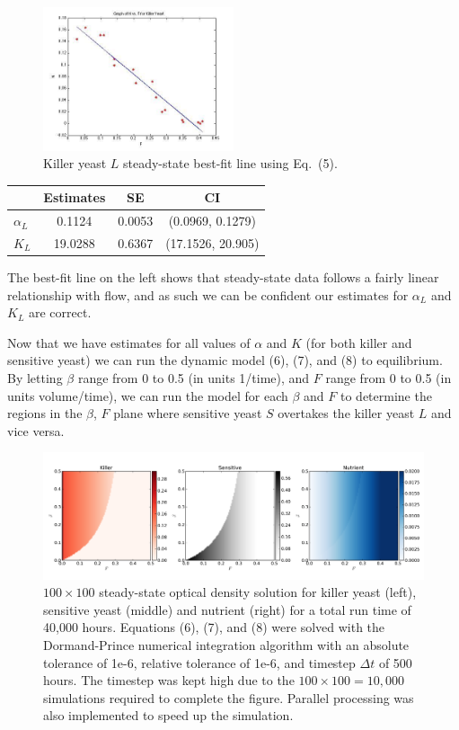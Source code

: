 \begin{multicols}{2}
\begin{figure}[H]
  \centering
    \includegraphics[width=0.5\textwidth]{images/killerFit.jpg}
  \caption{\footnotesize Killer yeast $L$ steady-state best-fit line using Eq.\ (5).}
\end{figure}
\begin{center}
\begin{tabular}{l | c c c}
  & Estimates & SE & CI \\ 
  \hline
  $\alpha_L$ & 0.1124  & 0.0053 & (0.0969,  0.1279) \\
  $K_L$      & 19.0288 & 0.6367 & (17.1526, 20.905) \\
\end{tabular}
\end{center}
The best-fit line on the left shows that steady-state data follows a fairly linear relationship with flow, and as such we can be confident our estimates for $\alpha_L$ and $K_L$ are correct.
\end{multicols}

Now that we have estimates for all values of $\alpha$ and $K$ (for both killer and sensitive yeast) we can run the dynamic model (6), (7), and (8) to equilibrium.  By letting $\beta$ range from 0 to 0.5 (in units 1/time), and $F$ range from 0 to 0.5 (in units volume/time), we can run the model for each $\beta$ and $F$ to determine the regions in the $\beta$, $F$ plane where sensitive yeast $S$ overtakes the killer yeast $L$ and vice versa.
\begin{figure}[H]
  \centering
    \includegraphics[width=1.0\textwidth]{images/sols.png}
  \caption{\footnotesize $100 \times 100$ steady-state optical density solution for killer yeast (left), sensitive yeast (middle) and nutrient (right) for a total run time of 40,000 hours.  Equations (6), (7), and (8) were solved with the Dormand-Prince numerical integration algorithm with an absolute tolerance of 1e-6, relative tolerance of 1e-6, and timestep $\Delta t$ of 500 hours.  The timestep was kept high due to the $100 \times 100 = 10,000$ simulations required to complete the figure.  Parallel processing was also implemented to speed up the simulation.}
\end{figure}

